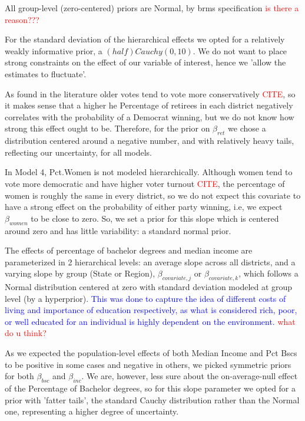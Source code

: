 \documentclass[12pt]{article}
\newcommand{\red}[1]{\textcolor{red}{#1}}
\newcommand{\blue}[1]{\textcolor{blue}{#1}}
\begin{document}
All group-level (zero-centered) priors are Normal, by brms specification \textcolor{red}{is there a reason???}

For the standard deviation of the hierarchical effects we opted for a relatively weakly informative prior, a $(half)Cauchy(0,10)$.
We do not want to place strong constraints on the effect of our variable of interest, hence we 'allow the estimates to fluctuate'.



As found in the literature older votes tend to vote more conservatively \red{CITE}, so it makes sense that a higher he Percentage of retirees in each district negatively correlates with the probability of a Democrat winning, but we do not know how strong this effect ought to be. Therefore, for the prior on $\beta_{ret}$ we chose a distribution centered around a negative number, and with relatively heavy tails, reflecting our uncertainty, for all models. 



In Model 4, Pct.Women is not modeled hierarchically.
Although women tend to vote more democratic and have higher voter turnout \red{CITE}, the percentage of women is roughly the same in every district, so we do not expect this covariate to have a strong effect on the probability of either party winning, i.e, we expect $\beta_{women}$ to be close to zero. So, we set a prior for this slope which is centered around zero and has little variability: a standard normal prior. 



The effects of percentage of bachelor degrees and median income are parameterized in 2 hierarchical levels: an average slope across all districts, and a varying slope by group (State or Region), $\beta_{covariate,j}$ or $\beta_{covariate,k}$, which follows a Normal distribution centered at zero with standard deviation modeled at group level (by a hyperprior). \blue{This was done to capture the idea of different costs of living and importance of education respectively, as what is considered rich, poor, or well educated for an individual is highly dependent on the environment. }\red{what do u think?}

 

As we expected the population-level effects of both Median Income and Pct Bscs to be positive in some cases and negative in others, we picked symmetric priors for both $\beta_{bsc}$ and $\beta_{inc}$. We are, however, less sure about the on-average-null effect of the Percentage of Bachelor degrees, so for this slope parameter we opted for a prior with 'fatter tails', the standard Cauchy distribution rather than the Normal one, representing a higher degree of uncertainty.
\end{document}
